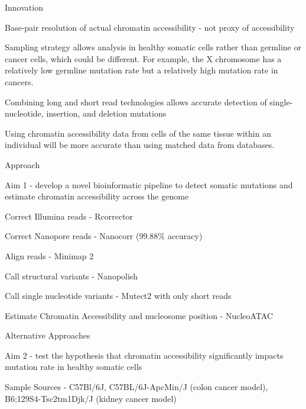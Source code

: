 \begin{outline}
\begin{outline}
\begin{outline}
		\end{outline}
	\end{outline}
	\item Innovation
	\begin{outline}
		\item Base-pair resolution of actual chromatin accessibility - not proxy of accessibility
		\item Sampling strategy allows analysis in healthy somatic cells rather than germline or cancer cells, which could be different. For example, the X chromosome has a relatively low germline mutation rate but a relatively high mutation rate in cancers. \parencite{makova_effects_2015}
		\item Combining long and short read technologies allows accurate detection of single-nucleotide, insertion, and deletion mutations
		\item Using chromatin accessibility data from cells of the same tissue within an individual will be more accurate than using matched data from databases.
	\end{outline}
	\item Approach
	\begin{outline}
		\item Aim 1 - develop a novel bioinformatic pipeline to detect somatic mutations and estimate chromatin accessibility across the genome
			\begin{outline}
				\item Correct Illumina reads - Rcorrector
				\item Correct Nanopore reads - Nanocorr (99.88\% accuracy) \parencite{goodwin_oxford_2015}
				\item Align reads - Minimap 2
				\item Call structural variants - Nanopolish
				\item Call single nucleotide variants - Mutect2 with only short reads
				\item Estimate Chromatin Accessibility and nucleosome position - NucleoATAC \parencite{schep_structured_2015} 
				\item Alternative Approaches
			\end{outline}
		\item Aim 2 - test the hypothesis that chromatin accessibility significantly impacts mutation rate in healthy somatic cells
			\begin{outline}
				\item Sample Sources - C57Bl/6J, C57BL/6J-ApcMin/J (colon cancer model), B6;129S4-Tsc2tm1Djk/J (kidney cancer model)

\end{outline}
\end{outline}
\end{outline}
